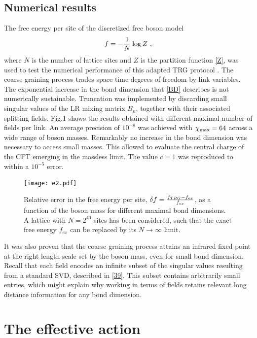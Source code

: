 \documentclass[a4paper,preprintnumbers,nofootinbib,twocolumn]{quantumarticle}
\newcommand{\be}{\begin{equation}} \newcommand{\ee}{\end{equation}}
\begin{document}
\subsection{Numerical results}

The free energy per site of the discretized free boson model
\be
f= -{1 \over N} \log Z \ ,
\ee
where $N$ is the number of lattice sites and $Z$ is the partition function \eqref{Z}, was used to test the numerical performance of this adapted TRG protocol \cite{CS19}.
The coarse graining process trades space time degrees of freedom by link variables. 
The exponential increase in the bond dimension that \eqref{BD} describes is not numerically sustainable. 
Truncation was implemented by discarding small singular values of the LR mixing matrix $B_n$, together with their associated splitting fields.
Fig.1 shows the results obtained with different maximal number of fields per link.
An average precision of $10^{-8}$ was achieved with $\chi_{\rm max}=64$ across a wide range of boson masses.
Remarkably no increase in the bond dimension was necessary to access small masses.
This allowed to evaluate the central charge of the CFT emerging in the massless limit. The value $c=1$ was reproduced to within a $10^{-5}$  error. 

\begin{figure}[h]
\begin{center}
\texttt{[image: e2.pdf]}~~~
\end{center}
\vspace*{-5mm}
\caption{\label{fig:fe} Relative error in the free energy per site, $\delta f={f_{TRG}-f_{ex} \over f_{ex}}$,  as a function of the boson mass
for different maximal bond dimensions. A lattice with $N=2^{40}$ sites has been considered, such that the exact free energy $f_{ex}$ can be replaced by its $N\to \infty$ limit. 
}
\end{figure}

It was also proven that the coarse graining process attains an infrared fixed point at the right length scale set by the boson mass, even for small bond dimension.
Recall that each field encodes an infinite subset of the singular values resulting from a standard SVD, described in \eqref{39}. 
This subset contains arbitrarily small entries, which might explain why
working in terms of fields retains relevant long distance information for any bond dimension.

\section{The effective action}
\end{document}
